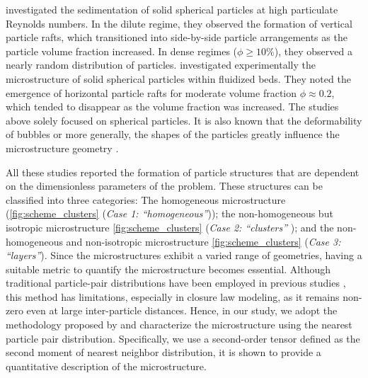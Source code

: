 \citet{shajahan2023inertial} investigated the sedimentation of solid spherical particles at high particulate Reynolds numbers.
In the dilute regime, they observed the formation of vertical particle rafts, which transitioned into side-by-side particle arrangements as the particle volume fraction increased. In dense regimes ($\phi \geq 10 \%$), they observed a nearly random distribution of particles. %
\citet{almeras2021statistics} investigated experimentally the microstructure of solid spherical particles within fluidized beds. They noted the emergence of horizontal particle rafts for moderate volume fraction $\phi \approx 0.2$, which tended to disappear as the volume fraction was increased.  %
The studies above solely focused on spherical particles.
It is also known that the deformability of bubbles or more generally, the shapes of the particles greatly influence the microstructure geometry \citep{bunner2003effect,seyed2021sedimentation}.

All these studies reported the formation of particle structures that are dependent on the dimensionless parameters of the problem.
These structures can be classified into three categories: The homogeneous microstructure (\ref{fig:scheme_clusters} (\textit{Case 1: ``homogeneous''})); the non-homogeneous but isotropic microstructure \ref{fig:scheme_clusters} (\textit{Case 2: ``clusters'' }); and the non-homogeneous and non-isotropic microstructure \ref{fig:scheme_clusters} (\textit{Case 3: ``layers''}).
Since the microstructures exhibit a varied range of geometries, having a suitable metric to quantify the microstructure becomes essential. 
Although traditional particle-pair distributions have been employed in previous studies \citep{yin2007,cartellier2009induced, seyed2021sedimentation}, this method has limitations, especially in closure law modeling, as it remains non-zero even at large inter-particle distances. 
Hence, in our study, we adopt the methodology proposed by \citep{zhang2023evolution} and characterize the microstructure using the nearest particle pair distribution.
Specifically, we use a second-order tensor defined as the second moment of nearest neighbor distribution, it is shown to provide a quantitative description of the microstructure.

